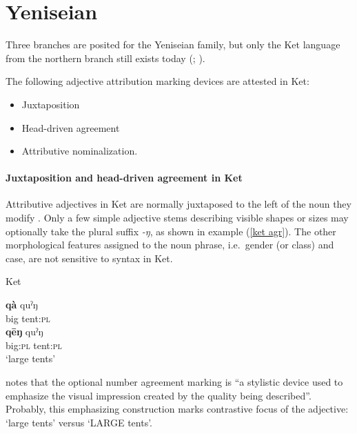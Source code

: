 \section{Yeniseian}\label{yeniseian synchr}
Three branches are posited for the Yeniseian family, but only the Ket language from the northern branch still exists today (\citealt{werner1997a}; \citealt[223]{salminen2007}).

The following adjective attribution marking devices are attested in Ket:
\begin{itemize}
\item Juxtaposition
\item Head-driven agreement
\item Attributive nominalization.
\end{itemize}

\paragraph{Juxtaposition and head-driven agreement in Ket}
Attributive adjectives in Ket are normally juxtaposed to the left of the noun they modify \cite[38]{vajda2004}. Only a few simple adjective stems describing visible shapes or sizes may optionally take the plural suffix \textit{-ŋ}, as shown in example (\ref{ket agr}). The other morphological features assigned to the noun phrase, i.e.~gender (or class) and case, are not sensitive to syntax in Ket.
\begin{exe}
\ex 
\label{ket agr}
\rm{Ket \citep[38]{vajda2004}} 
\begin{xlist}
\ex	
\gll	\textbf{qà} quˀŋ\\
	big tent:\textsc{pl}\\
\ex	
\gll	\textbf{qēŋ} quˀŋ\\
	big:\textsc{pl} tent:\textsc{pl}\\
\glt	‘large tents’
\end{xlist}
\end{exe}
\citet[38]{vajda2004} notes that the optional number agreement marking is “a stylistic device used to emphasize the visual impression created by the quality being described”. Probably, this emphasizing construction marks contrastive focus of the adjective: ‘large tents’ versus ‘LARGE tents’. 

